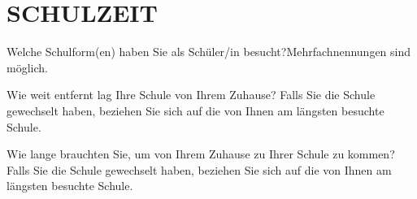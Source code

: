 
\section{\uppercase{Schulzeit}}
\vspace{.25cm}

\begin{choicequestion}[1]{Welche Schulform(en) haben Sie als Schüler/in besucht?\newline\footnotesize{Mehrfachnennungen sind möglich.}}
\end{choicequestion}

\separate

\begin{choicegroup}{Wie weit entfernt lag Ihre Schule von Ihrem Zuhause?
	\newline\footnotesize Falls Sie die Schule gewechselt haben, beziehen Sie sich auf die von Ihnen am längsten besuchte Schule.}

\end{choicegroup}


\separate

\begin{choicegroup}{Wie lange brauchten Sie, um von Ihrem Zuhause zu Ihrer Schule zu kommen?
	\newline\footnotesize Falls Sie die Schule gewechselt haben, beziehen Sie sich auf die von Ihnen am längsten besuchte Schule.}

\end{choicegroup}

